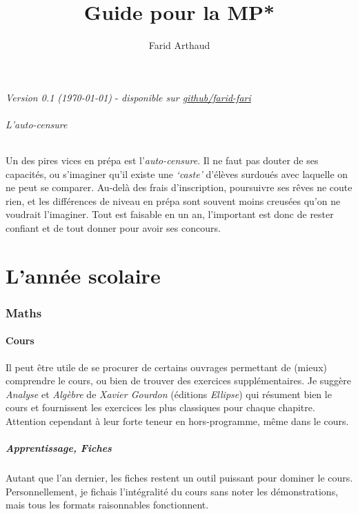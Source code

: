 \documentclass{article}
\begin{document}
\title{Guide pour la MP*}
\author{Farid Arthaud}
\maketitle
\tableofcontents

\textit{Version 0.1 (\today)} - \textit{disponible sur \href{https://github.com/farid-fari/guideprepa}{github/farid-fari}}

\paragraph{L'auto-censure}\mbox{}\newline
Un des pires vices en prépa est l'\textit{auto-censure}.
Il ne faut pas douter de ses capacités, ou s'imaginer qu'il existe une \textit{`caste'} d'élèves surdoués avec laquelle on ne peut se comparer.
Au-delà des frais d'inscription, poursuivre ses rêves ne coute rien, et les différences de niveau en prépa sont souvent moins creusées qu'on ne voudrait l'imaginer.
Tout est faisable en un an, l'important est donc de rester confiant et de tout donner pour avoir ses concours.

\part{L'année scolaire}
\section{Maths}
\subsection{Cours}
Il peut être utile de se procurer de certains ouvrages permettant de (mieux) comprendre le cours, ou bien de trouver des exercices supplémentaires.
Je suggère \textit{Analyse} et \textit{Algèbre} de \textit{Xavier Gourdon} (éditions \textit{Ellipse}) qui résument bien le cours et fournissent les exercices les plus classiques pour chaque chapitre.
Attention cependant à leur forte teneur en hors-programme, même dans le cours.

\subsubsection{Apprentissage, Fiches}
Autant que l'an dernier, les fiches restent un outil puissant pour dominer le cours.
Personnellement, je fichais l'intégralité du cours sans noter les démonstrations, mais tous les formats raisonnables fonctionnent.
\end{document}
